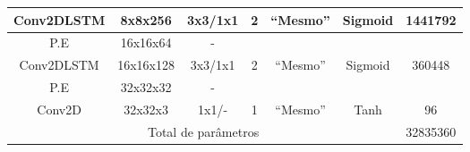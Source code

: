 \begin{table}[htbp]
\begin{adjustbox}{width=\columnwidth,center}
\begin{tabular}{|c|c|c|c|c|c|c|}
			Conv2DLSTM      & 8x8x256                                                              & 3x3/1x1                                                                                 & 2              & ``Mesmo''                   & Sigmoid                                                               & 1441792                                                                 \\ \hline
			P.E             & 16x16x64                                                             & -                                                                                       &                &                        &                                                                       &                                                                         \\ \hline
			Conv2DLSTM      & 16x16x128                                                            & 3x3/1x1                                                                                 & 2              & ``Mesmo''                   & Sigmoid                                                               & 360448                                                                  \\ \hline
			P.E             & 32x32x32                                                             & -                                                                                       &                &                        &                                                                       &                                                                         \\ \hline
			Conv2D          & 32x32x3                                                              & 1x1/-                                                                                   & 1              & ``Mesmo''                   & Tanh                                                                  & 96                                                                      \\ \hline
			\multicolumn{6}{|c|}{Total de parâmetros}                                                                                                                                                                                                                                                          & 32835360                                                                \\ \hline
		\end{tabular}\quad
	\end{adjustbox}
	\label{table:aerc}
\end{table}


